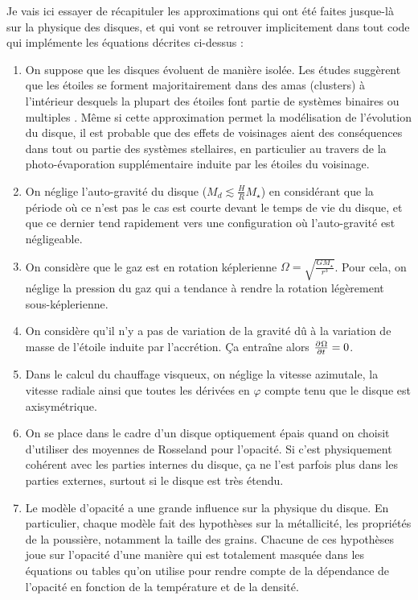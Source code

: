Je vais ici essayer de récapituler les approximations qui ont été faites jusque-là sur la physique des disques, et qui vont se retrouver implicitement dans tout code qui implémente les équations décrites ci-dessus : 
\begin{enumerate}
\item On suppose que les disques évoluent de manière isolée. Les études suggèrent que les étoiles se forment majoritairement dans des amas (clusters) à l'intérieur desquels la plupart des étoiles font partie de systèmes binaires ou multiples \citep{duquennoy1991multiplicity}. Même si cette approximation permet la modélisation de l'évolution du disque, il est probable que des effets de voisinages aient des conséquences dans tout ou partie des systèmes stellaires, en particulier au travers de la photo-évaporation supplémentaire induite par les étoiles du voisinage.
\item On néglige l'auto-gravité du disque ($M_d \lesssim \frac{H}{R}M_\star$) en considérant que la période où ce n'est pas le cas est courte devant le temps de vie du disque, et que ce dernier tend rapidement vers une configuration où l'auto-gravité est négligeable.
\item On considère que le gaz est en rotation képlerienne $\Omega=\sqrt{\frac{GM_\star}{r^3}}$. Pour cela, on néglige la pression du gaz qui a tendance à rendre la rotation légèrement sous-képlerienne.
\item On considère qu'il n'y a pas de variation de la gravité dû à la variation de masse de l'étoile induite par l'accrétion. Ça entraîne alors $\pd{\Omega}{t} = 0$.
\item Dans le calcul du chauffage visqueux, on néglige la vitesse azimutale, la vitesse radiale ainsi que toutes les dérivées en
$\varphi$ compte tenu que le disque est axisymétrique.
\item On se place dans le cadre d'un disque optiquement épais quand on choisit d'utiliser des moyennes de Rosseland pour
l'opacité. Si c'est physiquement cohérent avec les parties internes du disque, ça ne l'est parfois plus dans les parties
externes, surtout si le disque est très étendu.
\item Le modèle d'opacité a une grande influence sur la physique du disque. En particulier, chaque modèle fait des hypothèses sur la métallicité, les propriétés de la poussière, notamment la taille des grains. Chacune de ces hypothèses joue sur l'opacité d'une manière qui est totalement masquée dans les équations ou tables qu'on utilise pour rendre compte de la dépendance de l'opacité en fonction de la température et de la densité.

\end{enumerate}
